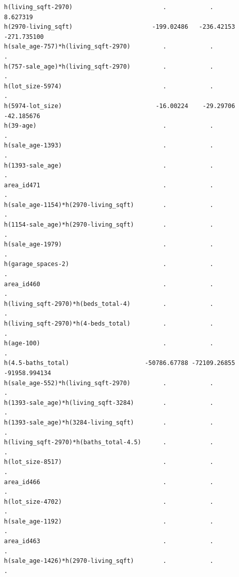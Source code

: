 \documentclass[
]{article}
\begin{document}
\begin{verbatim}
h(living_sqft-2970)                         .            .            8.627319
h(2970-living_sqft)                      -199.02486   -236.42153   -271.735100
h(sale_age-757)*h(living_sqft-2970)         .            .            .       
h(757-sale_age)*h(living_sqft-2970)         .            .            .       
h(lot_size-5974)                            .            .            .       
h(5974-lot_size)                          -16.00224    -29.29706    -42.185676
h(39-age)                                   .            .            .       
h(sale_age-1393)                            .            .            .       
h(1393-sale_age)                            .            .            .       
area_id471                                  .            .            .       
h(sale_age-1154)*h(2970-living_sqft)        .            .            .       
h(1154-sale_age)*h(2970-living_sqft)        .            .            .       
h(sale_age-1979)                            .            .            .       
h(garage_spaces-2)                          .            .            .       
area_id460                                  .            .            .       
h(living_sqft-2970)*h(beds_total-4)         .            .            .       
h(living_sqft-2970)*h(4-beds_total)         .            .            .       
h(age-100)                                  .            .            .       
h(4.5-baths_total)                     -50786.67788 -72109.26855 -91958.994134
h(sale_age-552)*h(living_sqft-2970)         .            .            .       
h(1393-sale_age)*h(living_sqft-3284)        .            .            .       
h(1393-sale_age)*h(3284-living_sqft)        .            .            .       
h(living_sqft-2970)*h(baths_total-4.5)      .            .            .       
h(lot_size-8517)                            .            .            .       
area_id466                                  .            .            .       
h(lot_size-4702)                            .            .            .       
h(sale_age-1192)                            .            .            .       
area_id463                                  .            .            .       
h(sale_age-1426)*h(2970-living_sqft)        .            .            .       
                                                                  

\end{verbatim}
\end{document}

